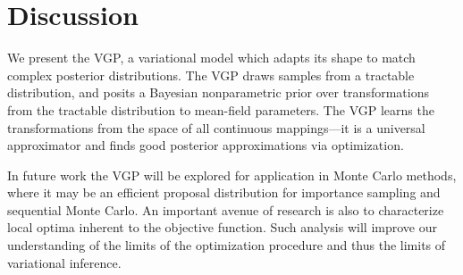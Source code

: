 
\section{Discussion}
\label{sec:discussion}

We present the \acrfull{VGP}, a variational model which adapts its
shape to match complex posterior distributions.
The \gls{VGP}
draws samples from a tractable distribution, and posits a Bayesian
nonparametric prior over transformations from the tractable
distribution to mean-field parameters.
The \gls{VGP} learns the transformations from the space of
all continuous mappings---it is a universal approximator and finds
good posterior approximations via optimization.

In future work the \gls{VGP} will be explored for application in Monte
Carlo methods, where it may be an efficient proposal distribution for
importance sampling and sequential Monte Carlo. An important avenue of
research is also to characterize local optima inherent to the
objective function. Such analysis will improve our
understanding of the limits of the optimization procedure and thus the
limits of variational inference.

